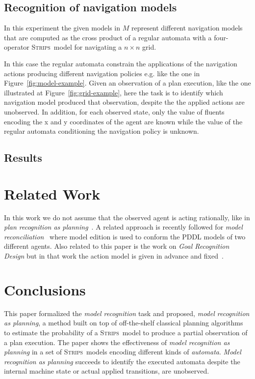 \documentclass[letterpaper]{article} %
\newcommand{\strips}{\textsc{Strips}}     %
\begin{document}
\subsection{Recognition of navigation models}
In this experiment the given models in $M$ represent different navigation models that are computed as the cross product of a regular automata with a four-operator \strips\ model for navigating a $n\times n$ grid.

In this case the regular automata constrain the applications of the navigation actions producing different navigation policies e.g. like the one in Figure~\ref{fig:model-example}. Given an observation of a plan execution, like the one illustrated at Figure~\ref{fig:grid-example}, here the task is to identify which navigation model produced that observation, despite the the applied actions are unobserved. In addition, for each observed state, only the value of fluents encoding the x and y coordinates of the agent are known while the value of the regular automata conditioning the navigation policy is unknown.



\subsection{Results}


\section{Related Work}
\label{sec:related}
In this work we do not assume that the observed agent is acting rationally, like in {\em plan recognition as planning}~\cite{ramirez2012plan,ramirez2009plan}. A related approach is recently followed for {\em model reconciliation}~\cite{Kambhampati:mreconciliation:ijcai17} where model edition is used to conform the PDDL models of two different agents. Also  related to this paper is the work on {\em Goal Recognition Design} but in that work the action model is given in advance and fixed~\cite{keren2014goal}.  



\section{Conclusions}
\label{sec:conclussions}
This paper formalized the {\em model recognition} task and proposed, {\em model recognition as planning}, a method built on top of off-the-shelf classical planning algorithms to estimate the probability of a \strips\ model to produce a partial observation of a plan execution. The paper shows the effectiveness of {\em model recognition as planning} in a set of \strips\ models encoding different kinds of {\em automata}. {\em Model recognition as planning} succeeds to identify the executed automata despite the internal machine state or actual applied transitions, are unobserved.
\end{document}
